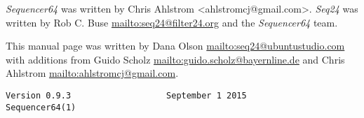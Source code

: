    \textsl{Sequencer64} was written by Chris Ahlstrom <ahlstromcj@gmail.com>.
   \textsl{Seq24} was written by Rob C. Buse \url{mailto:seq24@filter24.org}
   and the \textsl{Sequencer64} team.

   This manual page was written by Dana Olson
   \url{mailto:seq24@ubuntustudio.com} with additions from Guido Scholz
   \url{mailto:guido.scholz@bayernline.de} and Chris Ahlstrom
   \url{mailto:ahlstromcj@gmail.com}.

   \begin{verbatim}
Version 0.9.3                   September 1 2015                  Sequencer64(1)
   \end{verbatim}

